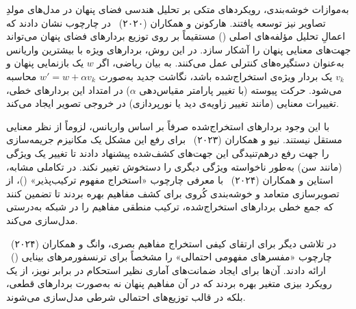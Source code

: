 به‌موازات خوشه‌بندی، رویکردهای متکی بر تحلیل هندسی فضای پنهان در مدل‌های مولدِ تصاویر نیز توسعه یافتند. هارکونن و همکاران (۲۰۲۰)~\cite{harkonen2020ganspace} در چارچوب  نشان دادند که اعمالِ تحلیل مؤلفه‌های اصلی () مستقیماً بر روی توزیع بردارهای فضای پنهان می‌تواند جهت‌های معنایی پنهان را آشکار سازد. در این روش، بردارهای ویژه با بیشترین واریانس به‌عنوان دستگیره‌های کنترلی عمل می‌کنند. به بیان ریاضی، اگر $w$ یک بازنمایی پنهان و $v_k$ یک بردار ویژه‌ی استخراج‌شده باشد، نگاشت جدید به‌صورت $w' = w + \alpha v_k$ محاسبه می‌شود. حرکت پیوسته (با تغییر پارامتر مقیاس‌دهی $\alpha$) در امتداد این بردارهای خطی، تغییرات معنایی (مانند تغییر زاویه‌ی دید یا نورپردازی) در خروجی تصویر ایجاد می‌کند.

با این وجود بردارهای استخراج‌شده صرفاً بر اساس واریانس، لزوماً از نظر معنایی مستقل نیستند. نیو و همکاران (۲۰۲۳)~\cite{niu2023disentangling} برای رفع این مشکل یک مکانیزم جریمه‌سازی را جهت رفع درهم‌تنیدگی این جهت‌های کشف‌شده پیشنهاد دادند تا تغییر یک ویژگی (مانند سن) به‌طور ناخواسته ویژگی دیگری را دستخوش تغییر نکند. در تکاملی مشابه، استاین و همکاران (۲۰۲۴)~\cite{stein2024towards} با معرفی چارچوب «استخراج مفهوم ترکیب‌پذیر» ()، از تصویرسازی متعامد و خوشه‌بندی کُروی برای کشف مفاهیم بهره بردند تا تضمین کنند که جمع خطی بردارهای استخراج‌شده، ترکیب منطقی مفاهیم را در شبکه به‌درستی مدل‌سازی می‌کند.

در تلاشی دیگر برای ارتقای کیفی استخراج مفاهیم بصری، وانگ و همکاران (۲۰۲۴)~\cite{wang2024probabilistic} چارچوب «مفسرهای مفهومی احتمالی» را مشخصاً برای ترنسفورمرهای بینایی ()~\cite{dosovitskiy2021imageworth} ارائه دادند. آن‌ها برای ایجاد ضمانت‌های آماری نظیر استحکام در برابر نویز، از یک رویکرد بیزی متغیر بهره بردند که در آن مفاهیم پنهان نه به‌صورت بردارهای قطعی، بلکه در قالب توزیع‌های احتمالی شرطی مدل‌سازی می‌شوند.

